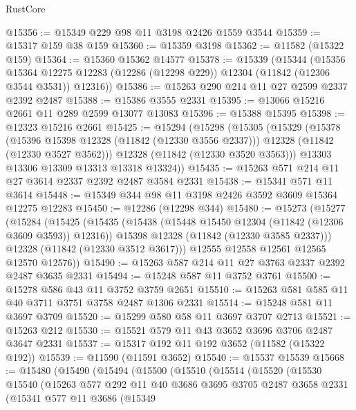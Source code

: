 \begin{lexlean}{RustCore}
\begin{coremodule}
@15356 := @15349 @229 @98 @11 @3198 @2426 @1559 @3544
@15359 := @15317 @159 @38 @159
@15360 := @15359 @3198
@15362 := @11582 (@15322 @159)
@15364 := @15360 @15362 @14577
@15378 := @15339
    (@15344
      (@15356
        @15364
        @12275
        @12283
        (@12286 (@12298 @229))
        @12304
        (@11842 (@12306 @3544 @3531))
        @12316))
@15386 := @15263 @290 @214 @11 @27 @2599 @2337 @2392 @2487
@15388 := @15386 @3555 @2331
@15395 := @13066 @15216 @2661 @11 @289 @2599 @13077 @13083
@15396 := @15388 @15395
@15398 := @12323 @15216 @2661
@15425 := @15294
    (@15298
      (@15305
        (@15329
          (@15378
            (@15396 @15398 @12328 (@11842 (@12330 @3556 @2337)))
            @12328
            (@11842 (@12330 @3527 @3562)))
          @12328
          (@11842 (@12330 @3520 @3563)))
        @13303
        @13306
        @13309
        @13313
        @13318
        @13324))
@15435 := @15263 @571 @214 @11 @27 @3614 @2337 @2392 @2487 @3584 @2331
@15438 := @15341 @571 @11 @3614
@15448 := @15349 @344 @98 @11 @3198 @2426 @3592 @3609 @15364 @12275 @12283
@15450 := @12286 (@12298 @344)
@15480 := @15273
    (@15277
      (@15284
        (@15425
          (@15435
            (@15438 (@15448 @15450 @12304 (@11842 (@12306 @3609 @3593)) @12316))
            @15398
            @12328
            (@11842 (@12330 @3585 @2337)))
          @12328
          (@11842 (@12330 @3512 @3617)))
        @12555
        @12558
        @12561
        @12565
        @12570
        @12576))
@15490 := @15263 @587 @214 @11 @27 @3763 @2337 @2392 @2487 @3635 @2331
@15494 := @15248 @587 @11 @3752 @3761
@15500 := @15278 @586 @43 @11 @3752 @3759 @2651
@15510 := @15263 @581 @585 @11 @40 @3711 @3751 @3758 @2487 @1306 @2331
@15514 := @15248 @581 @11 @3697 @3709
@15520 := @15299 @580 @58 @11 @3697 @3707 @2713
@15521 := @15263 @212
@15530 := @15521 @579 @11 @43 @3652 @3696 @3706 @2487 @3647 @2331
@15537 := @15317 @192 @11 @192 @3652 (@11582 (@15322 @192))
@15539 := @11590 (@11591 @3652)
@15540 := @15537 @15539
@15668 := @15480
    (@15490
      (@15494
        (@15500
          (@15510
            (@15514
              (@15520
                (@15530
                  @15540
                  (@15263
                    @577
                    @292
                    @11
                    @40
                    @3686
                    @3695
                    @3705
                    @2487
                    @3658
                    @2331
                    (@15341
                      @577
                      @11
                      @3686
                      (@15349

\end{coremodule}
\end{lexlean}
